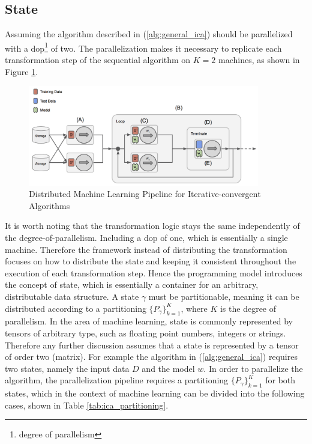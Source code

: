 \subsection{State}
Assuming the algorithm described in (\ref{alg:general_ica}) should be parallelized with a dop\footnote{degree of parallelism} of two.
The parallelization makes it necessary to replicate each transformation step of the sequential algorithm on $K = 2$ machines, as shown in Figure \ref{fig:ica_control_flow_dist}.
\begin{figure}[ht]
\centering
\includegraphics[width=0.9\textwidth]{img/ica_control_flow_dist.png}
\caption{Distributed Machine Learning Pipeline for Iterative-convergent Algorithms}
\label{fig:ica_control_flow_dist}
\end{figure}
It is worth noting that the transformation logic stays the same independently of the degree-of-parallelism.
Including a dop of one, which is essentially a single machine.
Therefore the framework instead of distributing the transformation focuses on how to distribute the state and keeping it consistent throughout the execution of each transformation step.
Hence the programming model introduces the concept of state, which is essentially a container for an arbitrary, distributable data structure.
A state $\gamma$ must be partitionable, meaning it can be distributed according to a partitioning $\{P_{\gamma}\}_{k=1}^K$, where $K$ is the degree of parallelism.
In the area of machine learning, state is commonly represented by tensors of arbitrary type, such as floating point numbers, integers or strings.
Therefore any further discussion assumes that a state is represented by a tensor of order two (matrix).
For example the algorithm in (\ref{alg:general_ica}) requires two states, namely the input data $D$ and the model $w$.
In order to parallelize the algorithm, the parallelization pipeline requires a partitioning $\{P_\gamma\}_{k=1}^K$ for both states, which in the context of machine learning can be divided into the following cases, shown in Table \ref{tab:ica_partitioning}.
